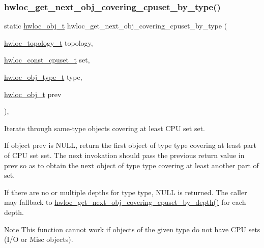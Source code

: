 \subsubsection{\texorpdfstring{hwloc\+\_\+get\+\_\+next\+\_\+obj\+\_\+covering\+\_\+cpuset\+\_\+by\+\_\+type()}{hwloc\_get\_next\_obj\_covering\_cpuset\_by\_type()}}
{\footnotesize\ttfamily static \hyperlink{a00185_ga79b8ab56877ef99ac59b833203391c7d}{hwloc\+\_\+obj\+\_\+t} hwloc\+\_\+get\+\_\+next\+\_\+obj\+\_\+covering\+\_\+cpuset\+\_\+by\+\_\+type (\begin{DoxyParamCaption}\item[{\hyperlink{a00186_ga9d1e76ee15a7dee158b786c30b6a6e38}{hwloc\+\_\+topology\+\_\+t}}]{topology,  }\item[{\hyperlink{a00183_ga1f784433e9b606261f62d1134f6a3b25}{hwloc\+\_\+const\+\_\+cpuset\+\_\+t}}]{set,  }\item[{\hyperlink{a00184_gacd37bb612667dc437d66bfb175a8dc55}{hwloc\+\_\+obj\+\_\+type\+\_\+t}}]{type,  }\item[{\hyperlink{a00185_ga79b8ab56877ef99ac59b833203391c7d}{hwloc\+\_\+obj\+\_\+t}}]{prev }\end{DoxyParamCaption})\hspace{0.3cm}{\ttfamily [inline]}, {\ttfamily [static]}}



Iterate through same-\/type objects covering at least C\+PU set {\ttfamily set}. 

If object {\ttfamily prev} is {\ttfamily N\+U\+LL}, return the first object of type {\ttfamily type} covering at least part of C\+PU set {\ttfamily set}. The next invokation should pass the previous return value in {\ttfamily prev} so as to obtain the next object of type {\ttfamily type} covering at least another part of {\ttfamily set}.

If there are no or multiple depths for type {\ttfamily type}, {\ttfamily N\+U\+LL} is returned. The caller may fallback to \hyperlink{a00196_gaba4b6d86eba1169ced4b0e941d2bb5f0}{hwloc\+\_\+get\+\_\+next\+\_\+obj\+\_\+covering\+\_\+cpuset\+\_\+by\+\_\+depth()} for each depth.

\begin{DoxyNote}{Note}
This function cannot work if objects of the given type do not have C\+PU sets (I/O or Misc objects). 
\end{DoxyNote}
\mbox{\label{a00196_ga41acdcdbb8b95d70ecf6c572a3f67dca}} 
